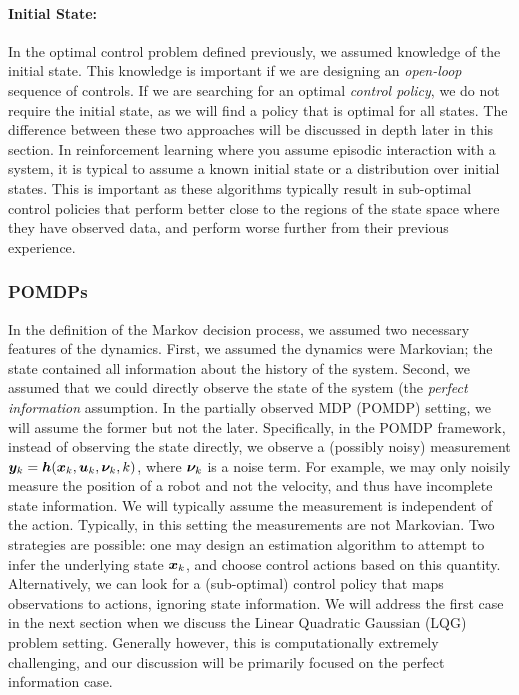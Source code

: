 \paragraph{Initial State:} In the optimal control problem defined previously, we assumed knowledge of the initial state. This knowledge is important if we are designing an \textit{open-loop} sequence of controls. If we are searching for an optimal \textit{control policy}, we do not require the initial state, as we will find a policy that is optimal for all states. The difference between these two approaches will be discussed in depth later in this section. In reinforcement learning where you assume episodic interaction with a system, it is typical to assume a known initial state or a distribution over initial states. This is important as these algorithms typically result in sub-optimal control policies that perform better close to the regions of the state space where they have observed data, and perform worse further from their previous experience. 

\subsubsection{POMDPs}

In the definition of the Markov decision process, we assumed two necessary features of the dynamics. First, we assumed the dynamics were Markovian; the state contained all information about the history of the system. Second, we assumed that we could directly observe the state of the system (the \textit{perfect information} assumption. In the partially observed MDP (POMDP) setting, we will assume the former but not the later. Specifically, in the POMDP framework, instead of observing the state directly, we observe a (possibly noisy) measurement $\bm{y}_k = \bm{h}(\bm{x}_k, \bm{u}_k, \bm{\nu}_k, k)$, where $\bm{\nu}_k$ is a noise term. For example, we may only noisily measure the position of a robot and not the velocity, and thus have incomplete state information. We will typically assume the measurement is independent of the action. Typically, in this setting the measurements are not Markovian. Two strategies are possible: one may design an estimation algorithm to attempt to infer the underlying state $\bm{x}_k$, and choose control actions based on this quantity. Alternatively, we can look for a (sub-optimal) control policy that maps observations to actions, ignoring state information. We will address the first case in the next section when we discuss the Linear Quadratic Gaussian (LQG) problem setting. Generally however, this is computationally extremely challenging, and our discussion will be primarily focused on the perfect information case. 

